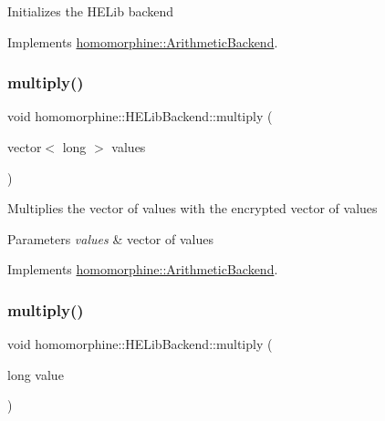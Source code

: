Initializes the H\+E\+Lib backend 

Implements \mbox{\hyperlink{classhomomorphine_1_1_arithmetic_backend_a2654ee62a6cf2f16fd41c834a26b0006}{homomorphine\+::\+Arithmetic\+Backend}}.

\mbox{\label{classhomomorphine_1_1_h_e_lib_backend_a05b508bcc4a165d045ebc09f190c5a95}} 
\subsubsection{\texorpdfstring{multiply()}{multiply()}\hspace{0.1cm}{\footnotesize\ttfamily [1/2]}}
{\footnotesize\ttfamily void homomorphine\+::\+H\+E\+Lib\+Backend\+::multiply (\begin{DoxyParamCaption}\item[{vector$<$ long $>$}]{values }\end{DoxyParamCaption})\hspace{0.3cm}{\ttfamily [virtual]}}

Multiplies the vector of values with the encrypted vector of values


\begin{DoxyParams}{Parameters}
{\em values} & vector of values \\
\hline
\end{DoxyParams}


Implements \mbox{\hyperlink{classhomomorphine_1_1_arithmetic_backend_a80f2424d26fcfad4803f6a0e5a9cdd2d}{homomorphine\+::\+Arithmetic\+Backend}}.

\mbox{\label{classhomomorphine_1_1_h_e_lib_backend_a49d4e073eecc4759f12f60188a533835}} 
\subsubsection{\texorpdfstring{multiply()}{multiply()}\hspace{0.1cm}{\footnotesize\ttfamily [2/2]}}
{\footnotesize\ttfamily void homomorphine\+::\+H\+E\+Lib\+Backend\+::multiply (\begin{DoxyParamCaption}\item[{long}]{value }\end{DoxyParamCaption})\hspace{0.3cm}{\ttfamily [virtual]}}

